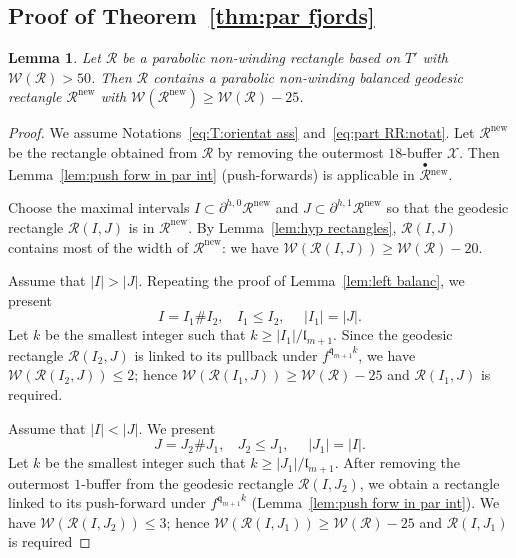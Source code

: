 \documentclass{amsart}
\renewcommand{\sp}{{\ \ }}
\newcommand{\1}{{\mathbb 1 }}
\newcommand{\upbullet}[1]{\overset{\bullet}{ #1}{}}
\newcommand{\Width}{{\mathcal W}}
\newcommand\RR{\mathcal{R}}
\newcommand\XX{\mathcal{X}}
\newcommand{\qq}{\mathfrak{q}}
\newcommand{\length}{{\mathfrak l}}
\newcommand\new{{\operatorname{new}}}
\newtheorem{lem}[thm]{Lemma}
\theoremstyle{remark}
\numberwithin{equation}{section}
\theoremstyle{definition}
\begin{document}
\subsection{Proof of Theorem~\ref{thm:par fjords}}
\label{ss:prf:thm:par fjords}



\begin{lem}
\label{lem:balance rectangle}
Let $\RR$ be a parabolic non-winding rectangle based on $T'$ with $\Width(\RR)>50$. Then $\RR$ contains a parabolic non-winding balanced geodesic rectangle $\RR^\new$ with $\Width(\RR^\new)\ge \Width(\RR)-25$.
\end{lem}
\begin{proof}
We assume Notations~\eqref{eq:T:orientat ass} and~\eqref{eq:part RR:notat}. Let $\RR^\new$ be the rectangle obtained from $\RR$ by removing the outermost $18$-buffer $\XX$. Then Lemma~\ref{lem:push forw in par int} (push-forwards) is applicable in $\upbullet \RR^\new$. 

Choose the maximal intervals $I\subset \partial^{h,0}\RR^\new $ and $J\subset \partial^{h,1}\RR^\new $ so that the geodesic rectangle $\RR(I,J)$ is in $\RR^\new$. By Lemma~\ref {lem:hyp rectangles},  $\RR(I,J)$ contains most of the width of $\RR^\new$: we have $\Width(\RR(I,J))\ge \Width(\RR)-20$.

Assume that $|I|>|J|$. Repeating the proof of Lemma~\ref{lem:left balanc}, we present 
\[ I=I_1\#I_2,\sp\sp I_1\le I_2,\sp\sp \sp |I_1|=|J|.\]
 Let $k$ be the smallest integer such that $k\ge |I_1|/\length_{m+1}$.  Since the geodesic rectangle $\RR(I_2,J)$ is linked to its pullback under $f^{\qq_{m+1}k}$, we have $\Width(\RR(I_2,J))\le 2$; hence $\Width(\RR(I_1,J))\ge \Width(\RR)-25$ and $\RR(I_1,J)$ is required.


Assume that $|I|<|J|$. We present 
\[ J=J_2\#J_1,\sp\sp J_2\le J_1,\sp\sp \sp |J_1|=|I|.\]
 Let $k$ be the smallest integer such that $k\ge |J_1|/\length_{m+1}$.  After removing the outermost  $1$-buffer from the geodesic rectangle $\RR(I,J_2)$, we obtain a rectangle linked to its push-forward under $f^{\qq_{m+1}k}$ (Lemma~\ref{lem:push forw in par int}).
 We have $\Width(\RR(I,J_2))\le 3$; hence $\Width(\RR(I,J_1))\ge \Width(\RR)-25$ and $\RR(I,J_1)$ is required
\end{proof}
\end{document}
